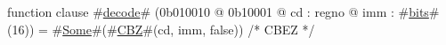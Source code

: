 function clause #\hyperref[zdecode]{decode}# (0b010010 @ 0b10001 @ cd : regno @ imm : #\hyperref[zbits]{bits}#(16)) = #\hyperref[zSome]{Some}#(#\hyperref[zCBZ]{CBZ}#(cd, imm, false)) /* CBEZ */
